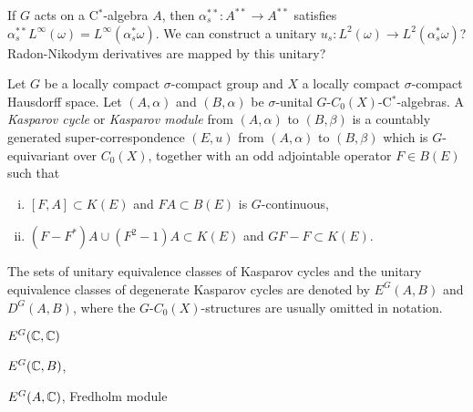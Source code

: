 \documentclass{../../large}
\begin{document}
If $G$ acts on a C$^*$-algebra $A$, then $\alpha_s^{**}:A^{**}\to A^{**}$ satisfies $\alpha_s^{**}L^\infty(\omega)=L^\infty(\alpha_s^*\omega)$.
We can construct a unitary $u_s:L^2(\omega)\to L^2(\alpha_s^*\omega)$?
Radon-Nikodym derivatives are mapped by this unitary?


\begin{prb}
Let $G$ be a locally compact $\sigma$-compact group and $X$ a locally compact $\sigma$-compact Hausdorff space.
Let $(A,\alpha)$ and $(B,\alpha)$ be $\sigma$-unital $G$-$C_0(X)$-C$^*$-algebras.
A \emph{Kasparov cycle} or \emph{Kasparov module} from $(A,\alpha)$ to $(B,\beta)$ is a countably generated super-correspondence $(E,u)$ from $(A,\alpha)$ to $(B,\beta)$ which is $G$-equivariant over $C_0(X)$, together with an odd adjointable operator $F\in B(E)$ such that
\begin{enumerate}[(i)]
\item $[F,A]\subset K(E)$ and $FA\subset B(E)$ is $G$-continuous,
\item $(F-F^*)A\cup(F^2-1)A\subset K(E)$ and $GF-F\subset K(E)$.
\end{enumerate}
The sets of unitary equivalence classes of Kasparov cycles and the unitary equivalence classes of degenerate Kasparov cycles are denoted by $E^G(A,B)$ and $D^G(A,B)$, where the $G$-$C_0(X)$-structures are usually omitted in notation.
\begin{parts}
\item $E^G(\mathbb{C},\mathbb{C})$
\item $E^G(\mathbb{C},B)$,
\item $E^G(A,\mathbb{C})$, Fredholm module
\end{parts}
\end{prb}
\end{document}
